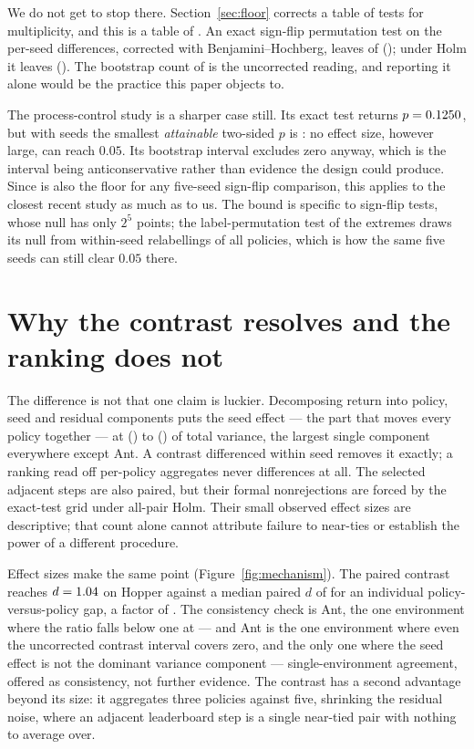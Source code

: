 \documentclass{article}
\begin{document}
We do not get to stop there. Section~\ref{sec:floor} corrects a table of
\NTests{} tests for multiplicity, and this is a table of \ContrastNTests{}. An
exact sign-flip permutation test on the per-seed differences, corrected with
Benjamini--Hochberg, leaves \ContrastBH{} of \ContrastNTests{}
(\ContrastBHList{}); under Holm it leaves \ContrastHolm{}
(\ContrastHolmList{}). The bootstrap count of \ContrastUncorrected{} is the
uncorrected reading, and reporting it alone would be the practice this paper
objects to.

The process-control study is a sharper case still. Its exact test returns
$p = 0.1250{}$, but with \SeedsPcgym{} seeds the smallest
\emph{attainable} two-sided $p$ is \ContrastPFloorPcgym{}: no effect size, however
large, can reach $0.05$. Its bootstrap interval excludes zero anyway, which is
the interval being anticonservative rather than evidence the design could
produce. Since \ContrastPFloorPcgym{} is also the floor for any five-seed
sign-flip comparison, this applies to the closest recent study
\citep{korniak2026nonuniform} as much as to us. The bound is specific to
sign-flip tests, whose null has only $2^5$ points; the label-permutation test
of the extremes draws its null from within-seed relabellings of all
\NPolPcgym{} policies, which is how the same five seeds can still clear
$0.05$ there.

\section{Why the contrast resolves and the ranking does not}
\label{sec:why}

The difference is not that one claim is luckier. Decomposing return into
policy, seed and residual components puts the seed effect --- the part that
moves every policy together --- at \IccMin{} (\IccMinEnv{}) to \IccMax{}
(\IccMaxEnv{}) of total variance, the largest single component everywhere
except Ant. A contrast differenced within seed removes it
exactly; a ranking read off per-policy aggregates never differences at all.
The selected adjacent steps are also paired, but their formal nonrejections
are forced by the exact-test grid under all-pair Holm. Their small observed
effect sizes are descriptive; that count alone cannot attribute failure to
near-ties or establish the power of a different procedure.

Effect sizes make the same point (Figure~\ref{fig:mechanism}). The paired
contrast reaches
$d = 1.04{}$ on Hopper against a median paired $d$ of
\PairDHopper{} for an individual policy-versus-policy gap, a factor of
\RatioHopper{}. The consistency check is Ant, the one environment where the
ratio falls below one at \RatioAnt{} --- and Ant is the one environment where
even the uncorrected contrast interval covers zero, and the only one where
the seed effect is not the dominant variance component --- single-environment
agreement, offered as consistency, not further evidence. The contrast has a second advantage
beyond its size: it aggregates three policies against five, shrinking the
residual noise, where an adjacent leaderboard step is a single near-tied pair
with nothing to average over.
\end{document}
